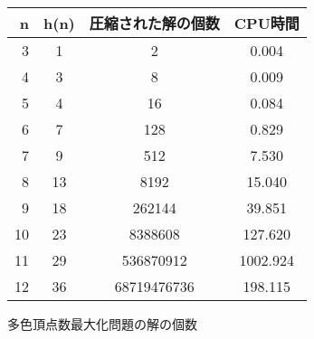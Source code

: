 \begin{tabular}{r|c|c|c}
 \hline
 n& h(n)& 圧縮された解の個数& CPU時間 \\
 \hline
 3&	1&	2&	0.004 \\
 4&	3&	8&	0.009 \\
 5&	4&	16&	0.084 \\
 6&	7&	128&	0.829 \\
 7&	9&	512&	7.530 \\
 8&	13&	8192&	15.040 \\
 9&	18&	262144&	39.851 \\
 10&	23&	8388608&	127.620 \\
 11&	29&	536870912&	1002.924 \\
 12&	36&	68719476736&	198.115 \\
\end{tabular}
\caption{多色頂点数最大化問題の解の個数}
\label{table:com}